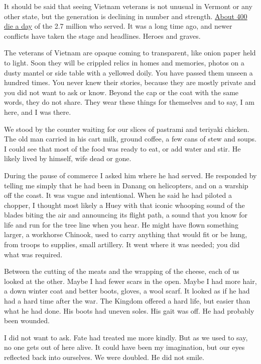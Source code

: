 It should be said that seeing Vietnam veterans is not unusual in Vermont
or any other state, but the generation is declining in number and
strength.
\href{https://www.nytimes3xbfgragh.onion/2013/03/26/science/how-many-vietnam-veterans-are-still-alive.html}{About
400 die a day} of the 2.7 million who served. It was a long time ago,
and newer conflicts have taken the stage and headlines. Heroes and
graves.

The veterans of Vietnam are opaque coming to transparent, like onion
paper held to light. Soon they will be crippled relics in homes and
memories, photos on a dusty mantel or side table with a yellowed doily.
You have passed them unseen a hundred times. You never knew their
stories, because they are mostly private and you did not want to ask or
know. Beyond the cap or the coat with the same words, they do not share.
They wear these things for themselves and to say, I am here, and I was
there.

We stood by the counter waiting for our slices of pastrami and teriyaki
chicken. The old man carried in his cart milk, ground coffee, a few cans
of stew and soups. I could see that most of the food was ready to eat,
or add water and stir. He likely lived by himself, wife dead or gone.

During the pause of commerce I asked him where he had served. He
responded by telling me simply that he had been in Danang on
helicopters, and on a warship off the coast. It was vague and
intentional. When he said he had piloted a chopper, I thought most
likely a Huey with that iconic whooping sound of the blades biting the
air and announcing its flight path, a sound that you know for life and
run for the tree line when you hear. He might have flown something
larger, a workhorse Chinook, used to carry anything that would fit or be
hung, from troops to supplies, small artillery. It went where it was
needed; you did what was required.

Between the cutting of the meats and the wrapping of the cheese, each of
us looked at the other. Maybe I had fewer scars in the open. Maybe I had
more hair, a down winter coat and better boots, gloves, a wool scarf. It
looked as if he had had a hard time after the war. The Kingdom offered a
hard life, but easier than what he had done. His boots had uneven soles.
His gait was off. He had probably been wounded.

I did not want to ask. Fate had treated me more kindly. But as we used
to say, no one gets out of here alive. It could have been my
imagination, but our eyes reflected back into ourselves. We were
doubled. He did not smile.

